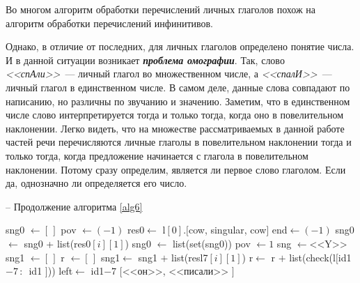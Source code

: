 \documentclass[main]{subfiles}
\begin{document}
Во многом алгоритм обработки перечислений личных глаголов похож на алгоритм обработки перечислений инфинитивов.

Однако, в отличие от последних, для личных глаголов определено понятие числа. И в данной ситуации возникает\textit{\textbf{ проблема омографии}}. Так, слово \textit{<<спАли>>}~--- личный глагол во множественном числе, а \textit{<<спалИ>>}~--- личный глагол в единственном числе. В самом деле, данные слова совпадают по написанию, но различны по звучанию и значению. Заметим, что в единственном числе слово интерпретируется тогда и только тогда, когда оно  в повелительном наклонении. Легко видеть, что на множестве рассматриваемых в данной работе частей речи перечисляются личные глаголы в повелительном наклонении тогда и только тогда, когда предложение начинается с глагола в повелительном наклонении. Потому сразу определим, является ли первое слово глаголом. Если да, однозначно ли определяется его число.
\begin{algorithm}
	\caption{-- Продолжение алгоритма \ref{alg6}}\label{alg12}
	\begin{algorithmic}[1]
		\State sng0 $\gets [\,]$
		\State pov $\gets (-1)$
		\State res0$\gets$ l$[0].[$cow, singular, cow$]$
		\State end$\gets (-1)$
		\label{st1}
		\State sng0 $\gets$ sng0 + list(res0$[i][1]$)
		\EndIf
		\EndFor
		\State sng0 $\gets$ list(set(sng0))
		\State pov $\gets 1$
		\State sng $\gets $<<Y>>  
		\EndIf
		\State sng1 $\gets [\, ]$ 
		\State r $\gets [\, ]$ 
		\State sng1$\gets$ sng1 $+$ list(resl7$[i][1]$)
		\State r$\gets$ r $+$ list(check(l$[$id1$-7\, :\, $ id1 $]$))
		\EndIf
		\EndFor
		 
		\State left$\gets$ id1$-7$
		\Else
		\State \Return $[$<<он>>, <<писали>> $]$
		\EndIf
		\EndIf
		\EndIf\label{st2}
	\end{algorithmic}
\end{algorithm}
\end{document}
